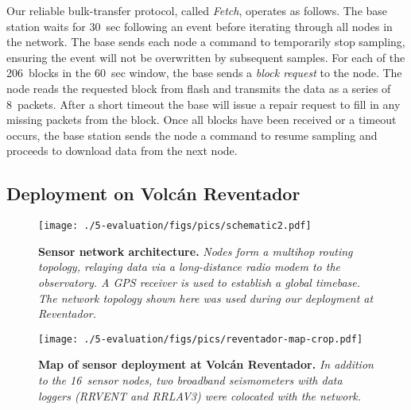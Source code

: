 Our reliable bulk-transfer protocol, called {\em Fetch}, operates
as follows. The base station waits for 30~sec following an event
before iterating through all nodes in the network. The base sends each
node a command to temporarily stop sampling, ensuring the event
will not be overwritten by subsequent samples. 
For each of the 206~blocks in the 60~sec window, 
the base sends a {\em block request} to the node.
The node reads the requested block from flash and 
transmits the data as a series of 8~packets. 
After a short timeout the base will issue
a repair request to fill in any missing packets from the block.
Once all blocks have been received or a timeout occurs, the base 
station sends the node a command to resume sampling and proceeds 
to download data from the next node. 

\subsection{Deployment on Volc\'{a}n Reventador}

\begin{figure}[t]
\begin{center}
\texttt{[image: ./5-evaluation/figs/pics/schematic2.pdf]}
\end{center}
\caption{\small {\bf Sensor network architecture.} {\em Nodes form a
multihop routing topology, relaying data via a long-distance radio
modem to the observatory. A GPS receiver is used to establish a global
timebase. The network topology shown here was used during
our deployment at Reventador.}}
\label{fig-schematic}
\end{figure}

\begin{figure}[t]
\begin{center}
\texttt{[image: ./5-evaluation/figs/pics/reventador-map-crop.pdf]}
\end{center}
\caption{\small {\bf Map of sensor deployment at Volc\'{a}n Reventador.}
{\em In addition to the 16~sensor nodes, two broadband seismometers
with data loggers (RRVENT and RRLAV3) were colocated with the network.}}
\label{fig-map}
\end{figure}


